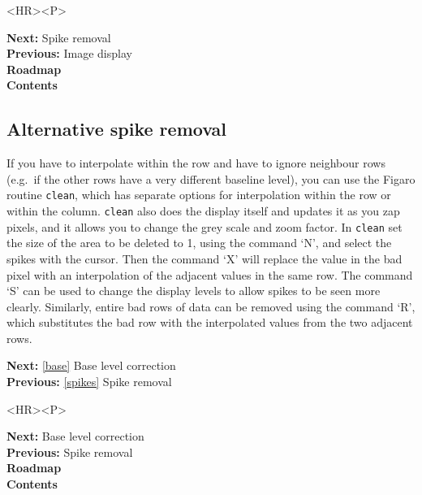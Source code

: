 \documentclass[11pt]{article}
\newenvironment{latexonly}{}{}
\newcommand{\htmlref}[2]{#1}
\newcommand{\xref}[3]{#1}
\newcommand{\xlabel}[1]{}
\begin{document}
\begin{htmlonly}
\begin{rawhtml} <HR><P> \end{rawhtml}
{\bf \htmlref{Next:}{spikes}} Spike removal\\
{\bf \htmlref{Previous:}{display}} Image display\\
{\bf \htmlref{Roadmap}{roadmap}}\\
{\bf \htmlref{Contents}{stardoccontents}}\\
\end{htmlonly}


\subsection{\label{spikes2}\xlabel{spikes2}Alternative spike removal}

   If you have to interpolate within the row and have to ignore neighbour
   rows (e.g.\ if the other rows have a very different baseline level),
   you can use the Figaro routine
{\tt \xref{clean}{sun86}{CLEAN}},
   which has separate options for interpolation within the row or within
   the column. {\tt clean} also does the display itself and updates it
   as you zap pixels, and it allows you to change the grey scale and
   zoom factor. In {\tt clean} set the size of the area to be deleted to
   1, using the command `N', and select the spikes with the cursor.
   Then the command `X' will replace the value in the bad pixel with an
   interpolation of the adjacent values in the same row. The command `S'
   can be used to change the display levels to allow spikes to be seen
   more clearly. Similarly, entire bad rows of data can be removed using
   the command `R', which substitutes the bad row with the interpolated
   values from the two adjacent rows.

\begin{latexonly}
{\bf Next:} \ref{base} Base level correction\\
{\bf Previous:} \ref{spikes} Spike removal\\
\end{latexonly}

\begin{htmlonly}
\begin{rawhtml} <HR><P> \end{rawhtml}
{\bf \htmlref{Next:}{base}} Base level correction\\
{\bf \htmlref{Previous:}{spikes}} Spike removal\\
{\bf \htmlref{Roadmap}{roadmap}}\\
{\bf \htmlref{Contents}{stardoccontents}}\\
\end{htmlonly}
\end{document}
